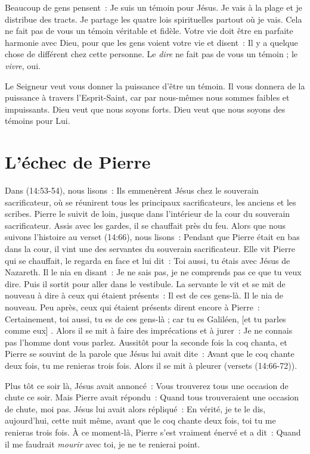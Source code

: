 Beaucoup de gens pensent~:
 \og Je suis un témoin pour Jésus. Je vais à la plage
 et je distribue des tracts. Je partage les quatre lois spirituelles
 partout où je vais. \fg{}
 Cela ne fait pas de vous un témoin véritable et fidèle.
 Votre vie doit être en parfaite harmonie avec Dieu,
 pour que les gens voient votre vie et disent~:
 \og Il y a quelque chose de différent chez cette personne. \fg{}
 Le \emph{dire} ne fait pas de vous un témoin ; le \emph{vivre}, oui.

Le Seigneur veut vous donner la puissance d'être un témoin.
 Il vous donnera de la puissance à travers l'Esprit-Saint,
 car par nous-mêmes nous sommes faibles et impuissants.
 Dieu veut que nous soyons forts.
 Dieu veut que nous soyons des témoins pour Lui.

\section*{L'échec de Pierre}

Dans (14:53-54), nous lisons~:
 \og Ils emmenèrent Jésus chez le souverain sacrificateur,
 où se réunirent tous les principaux sacrificateurs,
 les anciens et les scribes.
 Pierre le suivit de loin, jusque dans l'intérieur de la cour
 du souverain sacrificateur.
 Assis avec les gardes, il se chauffait près du feu. \fg{}
 Alors que nous suivons l'histoire au verset (14:66),
 nous lisons~:
 \og Pendant que Pierre était en bas dans la cour,
 il vint une des servantes du souverain sacrificateur.
 Elle vit Pierre qui se chauffait, le regarda en face et lui dit~:
 Toi aussi, tu étais avec Jésus de Nazareth. Il le nia en disant~:
 Je ne sais pas, je ne comprends pas ce que tu veux dire.
 Puis il sortit pour aller dans le vestibule.
 La servante le vit et se mit de nouveau à dire
 à ceux qui étaient présents~: Il est de ces gens-là.
 Il le nia de nouveau. Peu après, ceux qui étaient présents
 dirent encore à Pierre~: Certainement, toi aussi,
 tu es de ces gens-là ; car tu es Galiléen, [et tu parles comme eux] .
 Alors il se mit à faire des imprécations et à jurer~:
 Je ne connais pas l'homme dont vous parlez. Aussitôt pour la seconde fois
 la coq chanta, et Pierre se souvint de la parole que Jésus lui avait dite~:
 Avant que le coq chante deux fois, tu me renieras trois fois.
 Alors il se mit à pleurer \fg{} (versets (14:66-72)).

\begin{specialpar}{}
Plus tôt ce soir là, Jésus avait annoncé~:
 \og Vous trouverez tous une occasion de chute ce soir. \fg{}
 Mais Pierre avait répondu~:
 \og Quand tous trouveraient une occasion de chute, moi pas. \fg{}
 Jésus lui avait alors répliqué~:
 \og En vérité, je te le dis, aujourd'hui, cette nuit même,
 avant que le coq chante deux fois, toi tu me renieras trois fois. \fg{}
 À ce moment-là, Pierre s'est vraiment énervé et a dit~:
 \og Quand il me faudrait \emph{mourir} avec toi, je ne te renierai point. \fg{}
\end{specialpar}

